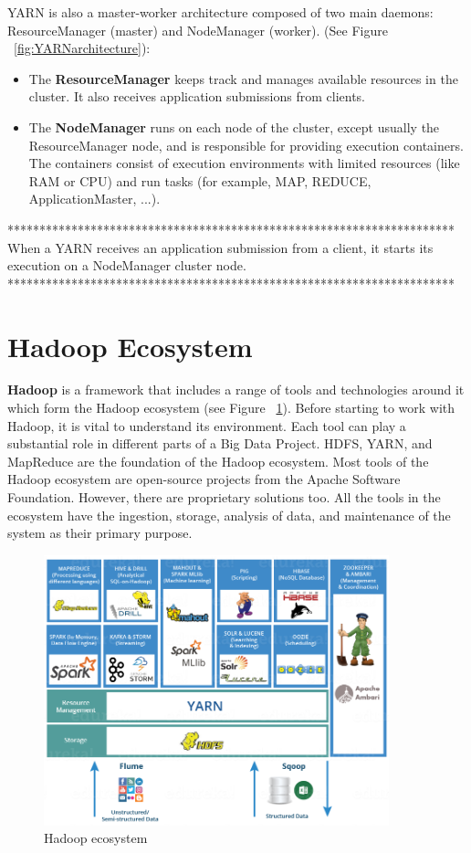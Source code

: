 \documentclass[12pt,english]{book}
\begin{document}
YARN is also a master-worker architecture composed of two main daemons: ResourceManager (master) and NodeManager (worker). (See Figure ~\ref{fig:YARNarchitecture}):

\begin{itemize}
\item
The \textbf{ResourceManager} keeps track and manages available resources in the cluster. It also receives application submissions from clients.

\item
The \textbf{NodeManager} runs on each node of the cluster, except usually the ResourceManager node, and is responsible for providing execution containers. The containers consist of execution environments with limited resources (like RAM or CPU) and run tasks (for example, MAP, REDUCE, ApplicationMaster, ...).
\end{itemize}

**********************************************************************
When a YARN receives an application submission from a client, it starts its execution on a NodeManager cluster node.
**********************************************************************

\section{Hadoop Ecosystem}

\textbf{Hadoop} is a framework that includes a range of tools and technologies around it which form the Hadoop ecosystem (see Figure ~\ref{fig:HadoopEco}).
Before starting to work with Hadoop, it is vital to understand its environment.
Each tool can play a substantial role in different parts of a Big Data Project.
HDFS, YARN, and MapReduce are the foundation of the Hadoop ecosystem. Most tools of the Hadoop ecosystem are open-source projects from the Apache Software Foundation. However, there are proprietary solutions too.
All the tools in the ecosystem have the ingestion, storage, analysis of data, and maintenance of the system as their primary purpose.

\begin{figure}[ht]
	\centering
	\includegraphics[width=10cm]{hadoopEco}
	\caption[Hadoop ecosystem]{Hadoop ecosystem \footnotemark}
\label{fig:HadoopEco}
\end{figure}
\end{document}
